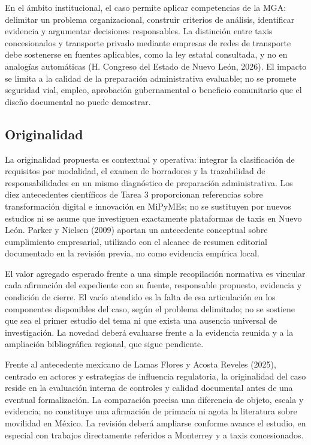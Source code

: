 {En el ámbito institucional, el caso permite aplicar competencias de la MGA: delimitar un problema organizacional, construir criterios de análisis, identificar evidencia y argumentar decisiones responsables. La distinción entre taxis concesionados y transporte privado mediante empresas de redes de transporte debe sostenerse en fuentes aplicables, como la ley estatal consultada, y no en analogías automáticas (H. Congreso del Estado de Nuevo León, 2026). El impacto se limita a la calidad de la preparación administrativa evaluable; no se promete seguridad vial, empleo, aprobación gubernamental o beneficio comunitario que el diseño documental no puede demostrar.


\subsection{Originalidad}
La originalidad propuesta es contextual y operativa: integrar la clasificación de requisitos por modalidad, el examen de borradores y la trazabilidad de responsabilidades en un mismo diagnóstico de preparación administrativa. Los diez antecedentes científicos de Tarea 3 proporcionan referencias sobre transformación digital e innovación en MiPyMEs; no se sustituyen por nuevos estudios ni se asume que investiguen exactamente plataformas de taxis en Nuevo León. Parker y Nielsen (2009) aportan un antecedente conceptual sobre cumplimiento empresarial, utilizado con el alcance de resumen editorial documentado en la revisión previa, no como evidencia empírica local.


El valor agregado esperado frente a una simple recopilación normativa es vincular cada afirmación del expediente con su fuente, responsable propuesto, evidencia y condición de cierre. El vacío atendido es la falta de esa articulación en los componentes disponibles del caso, según el problema delimitado; no se sostiene que sea el primer estudio del tema ni que exista una ausencia universal de investigación. La novedad deberá evaluarse frente a la evidencia reunida y a la ampliación bibliográfica regional, que sigue pendiente.


Frente al antecedente mexicano de Lamas Flores y Acosta Reveles (2025), centrado en actores y estrategias de influencia regulatoria, la originalidad del caso reside en la evaluación interna de controles y calidad documental antes de una eventual formalización. La comparación precisa una diferencia de objeto, escala y evidencia; no constituye una afirmación de primacía ni agota la literatura sobre movilidad en México. La revisión deberá ampliarse conforme avance el estudio, en especial con trabajos directamente referidos a Monterrey y a taxis concesionados.


}
